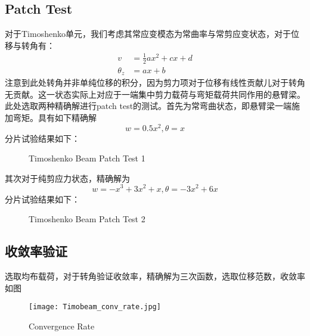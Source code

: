 \documentclass[forprint]{WHUBachelor}
\begin{document}
\subsection{Patch Test}
对于Timoshenko单元，我们考虑其常应变模态为常曲率与常剪应变状态，对于位移与转角有：
\begin{equation} 
\begin{aligned} v &=\frac{1}{2} a x^{2}+c x+d \\ \theta_{z} &=a x+b \end{aligned}
 \end{equation}
注意到此处转角并非单纯位移的积分，因为剪力项对于位移有线性贡献儿对于转角无贡献。这一状态实际上对应于一端集中剪力载荷与弯矩载荷共同作用的悬臂梁。此处选取两种精确解进行patch test的测试。首先为常弯曲状态，即悬臂梁一端施加弯矩。具有如下精确解
\begin{equation} 
w=0.5x^{2}, \theta= x
 \end{equation}
分片试验结果如下：
\begin{figure}[H]
\centering
  \hfill
  \hfill

  \caption{Timoshenko Beam Patch Test 1}\label{fig:2}
\end{figure}
其次对于纯剪应力状态，精确解为
\begin{equation} 
w=-x^3+3x^{2}+x, \theta= -3x^2+6x
 \end{equation}
分片试验结果如下：
\begin{figure}[H]
\centering
  \hfill
  \hfill

  \caption{Timoshenko Beam Patch Test 2}\label{fig:2}
\end{figure}

\subsection{收敛率验证}
选取均布载荷，对于转角验证收敛率，精确解为三次函数，选取位移范数，收敛率如图
\begin{figure}[H]
\centering
    \texttt{[image: Timobeam\_conv\_rate.jpg]}
  \caption{Convergence Rate}
\end{figure}



\end{document}
